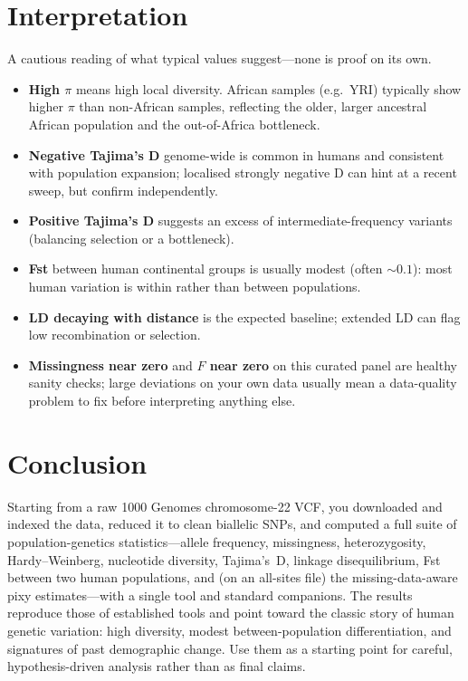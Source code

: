 \documentclass[11pt]{article}
\begin{document}
\section{Interpretation}
A cautious reading of what typical values suggest---none is proof on its own.
\begin{itemize}[leftmargin=*]
  \item \textbf{High $\pi$} means high local diversity. African samples (e.g.\
  YRI) typically show higher $\pi$ than non-African samples, reflecting the older,
  larger ancestral African population and the out-of-Africa bottleneck.
  \item \textbf{Negative Tajima's D} genome-wide is common in humans and
  consistent with population expansion; localised strongly negative D can hint at
  a recent sweep, but confirm independently.
  \item \textbf{Positive Tajima's D} suggests an excess of intermediate-frequency
  variants (balancing selection or a bottleneck).
  \item \textbf{Fst} between human continental groups is usually modest (often
  ${\sim}0.1$): most human variation is within rather than between populations.
  \item \textbf{LD decaying with distance} is the expected baseline; extended LD
  can flag low recombination or selection.
  \item \textbf{Missingness near zero} and \textbf{$F$ near zero} on this curated
  panel are healthy sanity checks; large deviations on your own data usually mean
  a data-quality problem to fix before interpreting anything else.
\end{itemize}

\section{Conclusion}
Starting from a raw 1000 Genomes chromosome-22 VCF, you downloaded and indexed the
data, reduced it to clean biallelic SNPs, and computed a full suite of
population-genetics statistics---allele frequency, missingness, heterozygosity,
Hardy--Weinberg, nucleotide diversity, Tajima's~D, linkage disequilibrium, Fst
between two human populations, and (on an all-sites file) the missing-data-aware
pixy estimates---with a single tool and standard companions. The results reproduce
those of established tools and point toward the classic story of human genetic
variation: high diversity, modest between-population differentiation, and
signatures of past demographic change. Use them as a starting point for careful,
hypothesis-driven analysis rather than as final claims.
\end{document}

